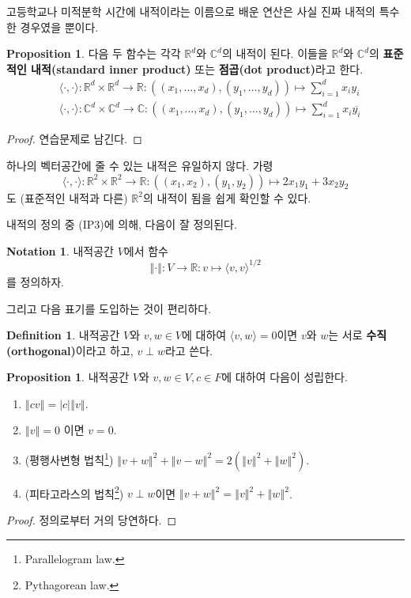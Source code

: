 \documentclass[11pt]{book}
\numberwithin{equation}{chapter}
\def\RR{\mathbb{R}}
\def\CC{\mathbb{C}}
\newcommand{\inner}[2]{\langle#1, #2\rangle}
\newcommand{\abs}[1]{\left\vert#1\right\vert}
\newcommand{\norm}[1]{\left\Vert#1\right\Vert}
\theoremstyle{definition}
\newtheorem{prop}[thm]{Proposition}
\newtheorem{defn}[thm]{Definition}
\newtheorem{notn}[thm]{Notation}
\begin{document}
고등학교나 미적분학 시간에 내적이라는 이름으로 배운 연산은 사실 진짜 내적의 특수한 경우였을 뿐이다.

\begin{prop} 다음 두 함수는 각각 \(\RR^d\)와 \(\CC^d\)의 내적이 된다. 이들을 \(\RR^d\)와 \(\CC^d\)의 \textbf{표준적인 내적(standard inner product)} 또는 \textbf{점곱(dot product)}라고 한다.
    \begin{align*}
        &\inner{\cdot}{\cdot} : \RR^d \times \RR^d \to \RR : ((x_1, \ldots, x_d), (y_1, \ldots, y_d)) \mapsto \sum_{i=1}^d x_i y_i\\
        &\inner{\cdot}{\cdot} : \CC^d \times \CC^d \to \CC : ((x_1, \ldots, x_d), (y_1, \ldots, y_d)) \mapsto \sum_{i=1}^d x_i \overline{y_i}
    \end{align*}
\end{prop}
\begin{proof}
    연습문제로 남긴다.
\end{proof}

하나의 벡터공간에 줄 수 있는 내적은 유일하지 않다. 가령
\[
\inner{\cdot}{\cdot} : \RR^2 \times \RR^2 \to \RR : ((x_1, x_2), (y_1, y_2)) \mapsto 2 x_1 y_1 + 3x_2 y_2    
\]
도 (표준적인 내적과 다른) \(\RR^2\)의 내적이 됨을 쉽게 확인할 수 있다.

내적의 정의 중 (IP3)에 의해, 다음이 잘 정의된다.

\begin{notn} \label{not 3.2.3}
    내적공간 \(V\)에서 함수
    \[
    \norm{\cdot} : V \to \RR : v \mapsto \inner{v}{v}^{1/2} 
    \]
    를 정의하자.
\end{notn}

그리고 다음 표기를 도입하는 것이 편리하다.

\begin{defn}
    내적공간 \(V\)와 \(v, w \in V\)에 대하여 \(\inner{v}{w} = 0\)이면 \(v\)와 \(w\)는 서로 \textbf{수직(orthogonal)}이라고 하고, \(v \perp w\)라고 쓴다.
\end{defn}

\begin{prop} \label{prop 3.2.5}
    내적공간 \(V\)와 \(v,w \in V, c \in F\)에 대하여 다음이 성립한다.
    \begin{enumerate}[label=(\alph*), leftmargin=2\parindent]
        \item \(\norm{cv} = \abs{c} \norm{v}\).
        \item \(\norm{v} = 0\) 이면 \(v = 0\).
        \item (평행사변형 법칙\footnote{Parallelogram law.}) \(\norm{v+w}^2 + \norm{v-w}^2 = 2(\norm{v}^2 + \norm{w}^2)\).
        \item (피타고라스의 법칙\footnote{Pythagorean law.}) \(v \perp w\)이면 \(\norm{v + w}^2 = \norm{v}^2 +\norm{w}^2\).
    \end{enumerate}
\end{prop}
\begin{proof}
    정의로부터 거의 당연하다.
\end{proof}
\end{document}
